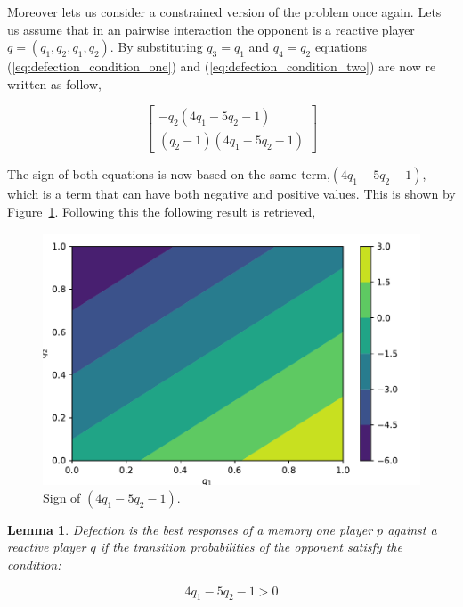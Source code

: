 \documentclass[10pt]{article}
\newtheorem{lemma}[theorem]{Lemma}
\begin{document}
Moreover lets us consider a constrained version of the problem once again. Lets us
assume that in an pairwise interaction the opponent is a reactive player \(q=(q_1, q_2, q_1, q_2)\).
By substituting \(q_3=q_1\) and \(q_4=q_2\) equations (\ref{eq:defection_condition_one})
and (\ref{eq:defection_condition_two}) are now re written as follow,

\[\left[\begin{matrix}- q_{2} \left(4 q_{1} - 5 q_{2} - 1\right)\\
\left(q_{2} - 1\right) \left(4 q_{1} - 5 q_{2} - 1\right)\end{matrix}\right]\]

The sign of both equations is now based on the same term,\(\left(4 q_{1} - 5 q_{2} - 1\right)\),
which is a term that can have both negative and positive values. This is shown
by Figure~\ref{fig:sign_against_reactive}. Following this the following result is retrieved,

\begin{figure}[htbp]
    \centering
    \includegraphics[width=0.45\linewidth]{img/sign_against_reactive.pdf}
      \caption{Sign of \(\left(4 q_{1} - 5 q_{2} - 1\right)\).}
      \label{fig:sign_against_reactive}
  \end{figure}

\begin{lemma}
Defection is the best responses of a memory one player \(p\) against a reactive
player \(q\) if the transition probabilities of the opponent satisfy the
condition:

\begin{equation}
    4 q_{1} - 5 q_{2} - 1 > 0
\end{equation}
\end{lemma}


\end{document}
